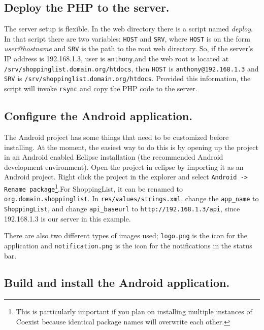 \documentclass[journal]{IEEEtran}
\begin{document}
\subsection{Deploy the PHP to the server.}  \label{sec:}

The server setup is flexible. In the web directory there is a script named \textit{deploy}. In that script there are two variables: \texttt{HOST} and \texttt{SRV}, where \texttt{HOST} is on the form \textit{user@hostname} and \texttt{SRV} is the path to the root web directory. So, if the server's IP address is 192.168.1.3, user is \texttt{anthony},and the web root is located at \texttt{/srv/shoppinglist.domain.org/htdocs}, then \texttt{HOST} is \texttt{anthony@192.168.1.3} and \texttt{SRV} is \texttt{/srv/shoppinglist.domain.org/htdocs}. Provided this information, the script will invoke \texttt{rsync} and copy the PHP code to the server. 



\subsection{Configure the Android application.}  \label{sec:}

The Android project has some things that need to be customized before installing. At the moment, the easiest way to do this is by opening up the project in an Android enabled Eclipse installation (the recommended Android development environment). Open the project in eclipse by importing it as an Android project. Right click the project in the explorer and select \texttt{Android -> Rename package}\footnote{This is particularly important if you plan on installing multiple instances of Coexist because identical package names will overwrite each other.}.For ShoppingList, it can be renamed to \texttt{org.domain.shoppinglist}. In \texttt{res/values/strings.xml}, change the \texttt{app\_name} to \texttt{ShoppingList}, and change \texttt{api\_baseurl} to \texttt{http://192.168.1.3/api}, since 192.168.1.3 is our server in this example.

There are also two different types of images used; \texttt{logo.png} is the icon for the application and \texttt{notification.png} is the icon for the notifications in the status bar.


\subsection{Build and install the Android application.}  \label{sec:}
\end{document}
